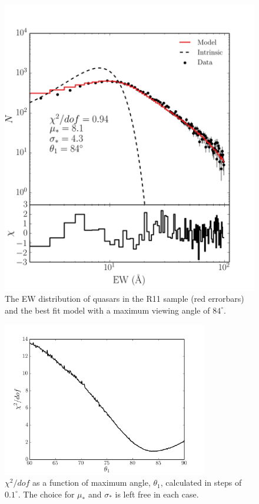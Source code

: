 \begin{figure}
\centering
\includegraphics[width=1.0\textwidth]{figures/ewpaper/log_quasar_fit.png}
\caption
{
The EW distribution of quasars in the R11 sample (red errorbars)
and the best fit model with a maximum viewing angle of
$84^\circ$.
}
\label{fig:chi2}
\end{figure}

\begin{figure}
\centering
\includegraphics[width=0.8\textwidth]{figures/ewpaper/chi2_o3.png}
\caption
{
$\chi^2/dof$ as a function of maximum angle, $\theta_1$, calculated in
steps of $0.1^\circ$. The choice for $\mu_*$ and $\sigma_*$ is 
left free in each case.
}
\label{fig:chi2_curve}
\end{figure}


